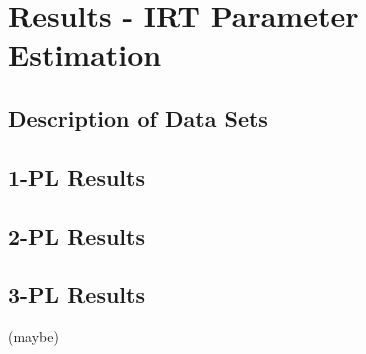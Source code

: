 \chapter{Results - IRT Parameter Estimation}

\section{Description of Data Sets}

\section{1-PL Results}

\section{2-PL Results}

\section{3-PL Results}
(maybe)


